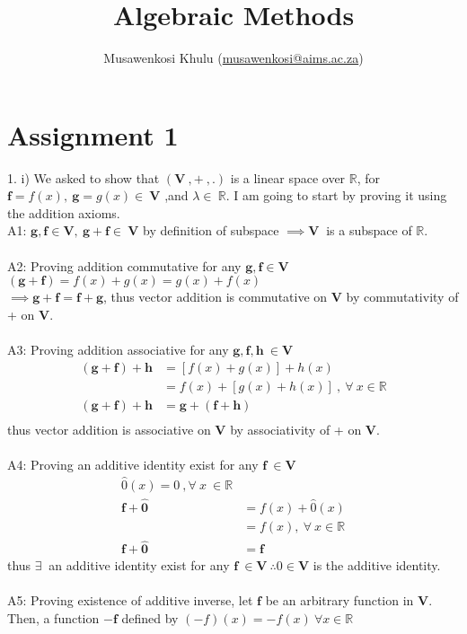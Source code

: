 \documentclass[10pt,a4paper]{article}
\author{Musawenkosi Khulu (\href{mailto:musawenkosi@aims.ac.za}{musawenkosi@aims.ac.za})}
\title{Algebraic Methods}
\numberwithin{equation}{section}
\begin{document}
	\maketitle
\section*{Assignment 1}
1.
i) We asked to show that $(\textbf{V}~,+~,.)$ is a linear space over $\mathbb{R}$, for $\mathbf{f}= f(x),~\mathbf{g}=g(x) \in~ \mathbf{V}$ ,and $\lambda\in ~\mathbb{R}$. I am going to start by proving it using the addition axioms. \\
A1: $\mathbf{g},\mathbf{f} \in \mathbf{V},~\mathbf{g}+\mathbf{f} \in~\mathbf{V}$ by definition of subspace $\implies \mathbf{V}~$ is a subspace of $\mathbb{R}$. \\
~\\
A2: Proving addition commutative for any $\mathbf{g,f} \in \mathbf{V}$ \\
$(\mathbf{g+f}) = f(x)+g(x)=g(x)+f(x)$ \\
$\implies \mathbf{g+f}=\mathbf{f+g}$, thus vector addition is commutative on $\mathbf{V}$ by commutativity of + on $\mathbf{V}$. \\
~\\
A3: Proving addition associative for any $\mathbf{g,f,h} \ \in \mathbf{V}$
\begin{align*}
	\mathbf{(g+f)+h}&=[f(x)+g(x)]+h(x) \\
	&=f(x)+[g(x)+h(x)]~,~ \forall~ x \in \mathbb{R} \\
\mathbf{(g+f)+h}&=\mathbf{g+(f+h)} \\
\end{align*}
thus vector addition is associative on $\mathbf{V}$ by associativity of + on $\mathbf{V}$. \\
~\\
A4: Proving an additive identity exist for any $\mathbf{f} \ \in \mathbf{V}$
\begin{align*}
\hat{0}(x)=0~, \forall~ x~\in \mathbb{R} \\
\mathbf{f+\hat{0}}&=f(x)+\hat{0}(x) \\
&=f(x),~ \forall~x \in \mathbb{R} \\
\mathbf{f+\hat{0}}&=\mathbf{f}
\end{align*}
thus $\exists~$ an additive identity exist for any $\mathbf{f} \ \in \mathbf{V}~ \therefore 0 \in \mathbf{V}$ is the additive identity. \\
~\\
A5: Proving existence of additive inverse, let $\mathbf{f}$ be an arbitrary function in $\mathbf{V}$. Then, a function $\mathbf{-f}$ defined by $(-f)(x) = -f(x) ~\forall x \in \mathbb{R}$
\end{document}
